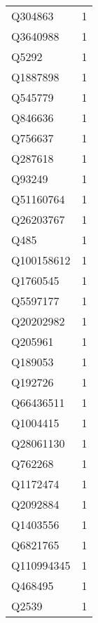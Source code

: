 \begin{tabular}{lr}
     Q304863 &                             1 \\
    Q3640988 &                             1 \\
       Q5292 &                             1 \\
    Q1887898 &                             1 \\
     Q545779 &                             1 \\
     Q846636 &                             1 \\
     Q756637 &                             1 \\
     Q287618 &                             1 \\
      Q93249 &                             1 \\
   Q51160764 &                             1 \\
   Q26203767 &                             1 \\
        Q485 &                             1 \\
  Q100158612 &                             1 \\
    Q1760545 &                             1 \\
    Q5597177 &                             1 \\
   Q20202982 &                             1 \\
     Q205961 &                             1 \\
     Q189053 &                             1 \\
     Q192726 &                             1 \\
   Q66436511 &                             1 \\
    Q1004415 &                             1 \\
   Q28061130 &                             1 \\
     Q762268 &                             1 \\
    Q1172474 &                             1 \\
    Q2092884 &                             1 \\
    Q1403556 &                             1 \\
    Q6821765 &                             1 \\
  Q110994345 &                             1 \\
     Q468495 &                             1 \\
       Q2539 &                             1 \\

\end{tabular}
